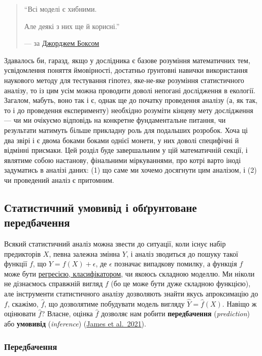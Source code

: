 \documentclass[
  11pt,
]{book}
\begin{document}
\begin{quote}
``Всі моделі є хибними.

Але деякі з них ще й корисні.''

--- за \href{https://doi.org/10.1080\%2F01621459.1976.10480949}{Джорджем Боксом}
\end{quote}

Здавалось би, гаразд, якщо у дослідника є базове розуміння математичних тем, усвідомлення поняття ймовірності, достатньо ґрунтовні навички використання наукового методу для тестування гіпотез, яке-не-яке розуміння статистичного аналізу, то із цим усім можна проводити доволі непогані дослідження в екології. Загалом, мабуть, воно так і є, однак ще до початку проведення аналізу (а, як так, то і до проведення експерименту) необхідно розуміти кінцеву мету дослідження --- чи ми очікуємо відповідь на конкретне фундаментальне питання, чи результати матимуть більше прикладну роль для подальших розробок. Хоча ці два звірі і є двома боками боками однієї монети, у них доволі специфічні й відмінні присмаки. Цей розділ буде завершальним у цій математичній секції, і являтиме собою настанову, фінальними міркуваннями, про котрі варто іноді задуматись в аналізі даних: (1) що саме ми хочемо досягнути цим аналізом, і (2) чи проведений аналіз є притомним.

\subsection{Статистичний умовивід і обґрунтоване передбачення}\label{inference}

Всякий статистичний аналіз можна звести до ситуації, коли існує набір предикторів \(X\), певна залежна змінна \(Y\), і аналіз зводиться до пошуку такої функції \(f\), що \(Y = f(X) + \epsilon\), де \(\epsilon\) позначає випадкову помилку, а функція \(f\) може бути \hyperref[regression]{регресією, класифікатором}, чи якоюсь складною моделлю. Ми ніколи не дізнаємось справжній вигляд \(f\) (бо це може бути дуже складною функцією), але інструменти статистичного аналізу дозволяють знайти якусь апроксимацію до \(f\), скажімо, \(\hat{f}\), що дозволятиме побудувати модель вигляду \(\hat{Y} = \hat{f}(X)\). Навіщо ж оцінювати \(\hat{f}\)? Власне, оцінка \(\hat{f}\) дозволяє нам робити \textbf{передбачення} (\emph{prediction}) або \textbf{умовивід} (\emph{inference}) (\href{https://doi.org/10.1007/978-1-0716-1418-1_2}{James et al.~2021}).

\subsubsection{Передбачення}\label{ux43fux435ux440ux435ux434ux431ux430ux447ux435ux43dux43dux44f}
\end{document}
